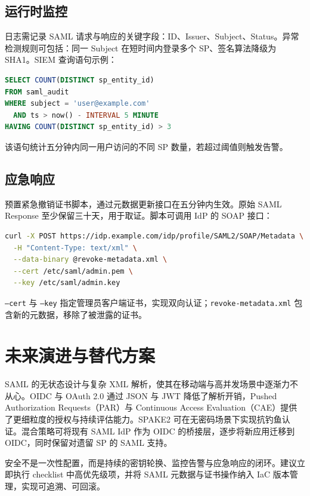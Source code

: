 \section{运行时监控}
日志需记录 SAML 请求与响应的关键字段：ID、Issuer、Subject、Status。异常检测规则可包括：同一 Subject 在短时间内登录多个 SP、签名算法降级为 SHA1。SIEM 查询语句示例：\par
\begin{lstlisting}[language=sql]
SELECT COUNT(DISTINCT sp_entity_id)
FROM saml_audit
WHERE subject = 'user@example.com'
  AND ts > now() - INTERVAL 5 MINUTE
HAVING COUNT(DISTINCT sp_entity_id) > 3
\end{lstlisting}
该语句统计五分钟内同一用户访问的不同 SP 数量，若超过阈值则触发告警。\par
\section{应急响应}
预置紧急撤销证书脚本，通过元数据更新接口在五分钟内生效。原始 SAML Response 至少保留三十天，用于取证。脚本可调用 IdP 的 SOAP 接口：\par
\begin{lstlisting}[language=bash]
curl -X POST https://idp.example.com/idp/profile/SAML2/SOAP/Metadata \
  -H "Content-Type: text/xml" \
  --data-binary @revoke-metadata.xml \
  --cert /etc/saml/admin.pem \
  --key /etc/saml/admin.key
\end{lstlisting}
\texttt{--cert} 与 \texttt{--key} 指定管理员客户端证书，实现双向认证；\texttt{revoke-metadata.xml} 包含新的元数据，移除了被泄露的证书。\par
\chapter{未来演进与替代方案}
SAML 的无状态设计与复杂 XML 解析，使其在移动端与高并发场景中逐渐力不从心。OIDC 与 OAuth 2.0 通过 JSON 与 JWT 降低了解析开销，Pushed Authorization Requests（PAR）与 Continuous Access Evaluation（CAE）提供了更细粒度的授权与持续评估能力。SPAKE2 可在无密码场景下实现抗钓鱼认证。混合策略可将现有 SAML IdP 作为 OIDC 的桥接层，逐步将新应用迁移到 OIDC，同时保留对遗留 SP 的 SAML 支持。\par
安全不是一次性配置，而是持续的密钥轮换、监控告警与应急响应的闭环。建议立即执行 checklist 中高优先级项，并将 SAML 元数据与证书操作纳入 IaC 版本管理，实现可追溯、可回滚。\par
